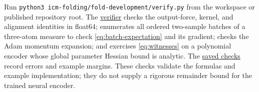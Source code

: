 \documentclass[11pt]{article}
\begin{document}
Run \texttt{python3\ icm-folding/fold-development/verify.py} from the
workspace or published repository root. The \href{https://github.com/c-tustin/JEPA-Identifiability-Predictive-Subspaces/blob/main/icm-folding/fold-development/verify.py}{verifier}
checks the output-force, kernel, and alignment identities in float64;
enumerates all ordered two-sample batches of a three-atom measure to
check \eqref{eq:batch-expectation} and its gradient; checks the Adam momentum expansion; and
exercises \eqref{eq:witnesses} on a polynomial encoder whose global parameter Hessian
bound is analytic. The \href{https://github.com/c-tustin/JEPA-Identifiability-Predictive-Subspaces/blob/main/icm-folding/fold-development/checks.json}{saved checks} record errors
and example margins. These checks validate the formulas and example
implementation; they do not supply a rigorous remainder bound for the
trained neural encoder.
\end{document}
